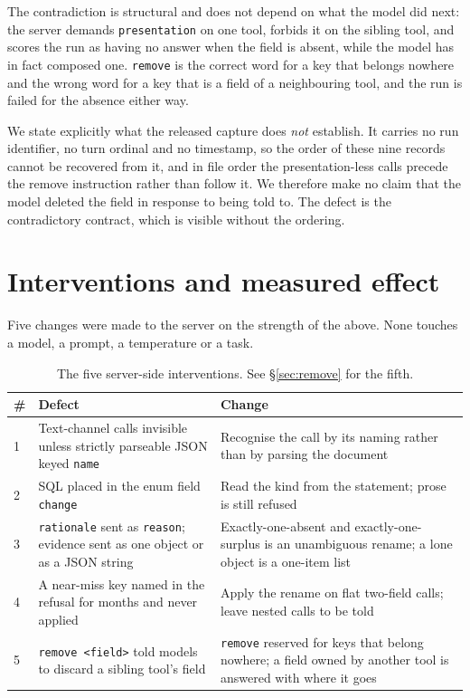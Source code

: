 \documentclass[11pt]{article}
\newcommand{\code}[1]{\texttt{\small #1}}
\begin{document}
The contradiction is structural and does not depend on what the model did next: the server demands
\code{presentation} on one tool, forbids it on the sibling tool, and scores the run as having no answer when the
field is absent, while the model has in fact composed one. \code{remove} is the correct word for a key that
belongs nowhere and the wrong word for a key that is a field of a neighbouring tool, and the run is failed for
the absence either way.

We state explicitly what the released capture does \emph{not} establish. It carries no run identifier, no turn
ordinal and no timestamp, so the order of these nine records cannot be recovered from it, and in file order the
presentation-less calls precede the remove instruction rather than follow it. We therefore make no claim that
the model deleted the field in response to being told to. The defect is the contradictory contract, which is
visible without the ordering.

\section{Interventions and measured effect}
\label{sec:interventions}

Five changes were made to the server on the strength of the above. None touches a model, a prompt, a temperature
or a task.

\begin{table}[htbp]
\centering\small
\begin{tabular}{@{}p{0.3cm}p{5.3cm}p{7.6cm}@{}}
\toprule
\# & Defect & Change \\
\midrule
1 & Text-channel calls invisible unless strictly parseable JSON keyed \code{name} & Recognise the call by its naming rather than by parsing the document \\
2 & SQL placed in the enum field \code{change} & Read the kind from the statement; prose is still refused \\
3 & \code{rationale} sent as \code{reason}; evidence sent as one object or as a JSON string & Exactly-one-absent and exactly-one-surplus is an unambiguous rename; a lone object is a one-item list \\
4 & A near-miss key named in the refusal for months and never applied & Apply the rename on flat two-field calls; leave nested calls to be told \\
5 & \code{remove <field>} told models to discard a sibling tool's field & \code{remove} reserved for keys that belong nowhere; a field owned by another tool is answered with where it goes \\
\bottomrule
\end{tabular}
\caption{The five server-side interventions. See \S\ref{sec:remove} for the fifth.}
\end{table}
\end{document}
